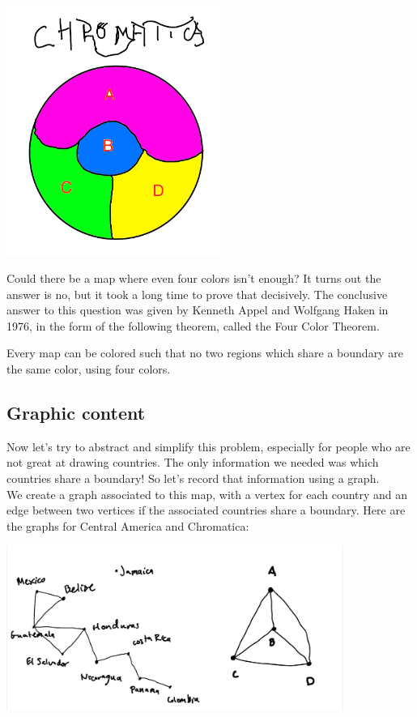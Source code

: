 \begin{center}
\includegraphics[width=7cm]{pics/chromatica-colored.png}
\end{center}

Could there be a map where even four colors isn't enough?
It turns out the answer is no, but it took a long time to prove that decisively. The conclusive answer to this question was given by Kenneth Appel and Wolfgang Haken in 1976, in the form of the following theorem, called the Four Color Theorem.

\begin{theorem}
Every map can be colored such that no two regions which share a boundary are the same color, using four colors.
\end{theorem}


\subsection{Graphic content}

Now let's try to abstract and simplify this problem, especially for people who are not great at drawing countries.
The only information we needed was which countries share a boundary! So let's record that information using a graph.\\

We create a graph associated to this map, with a vertex for each country and an edge between two vertices if the associated countries share a boundary. Here are the graphs for Central America and Chromatica:

\begin{center}
\includegraphics[width=11cm]{pics/map-graphs.jpeg}
\end{center}

